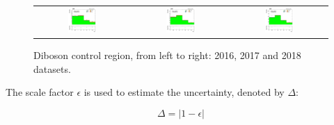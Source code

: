 \begin{figure}[tbh!]
 \begin{center}
 \begin{tabular}{ccc}
  \includegraphics[width=0.325\textwidth]{figures/Part3/Systematics/njet_2016}&
    \includegraphics[width=0.325\textwidth]{figures/Part3/Systematics/njet_2017}&
  \includegraphics[width=0.325\textwidth]{figures/Part3/Systematics/njet_2018}\\
 \end{tabular}
 \caption{Diboson control region, from left to right: 2016, 2017 and 2018 datasets.}
 \label{fig:VV_CR}
 \end{center}
\end{figure}

The scale factor $\epsilon$ is used to estimate the uncertainty, denoted by $\Delta$:

\begin{equation}
\Delta=|1-\epsilon|
\end{equation}

